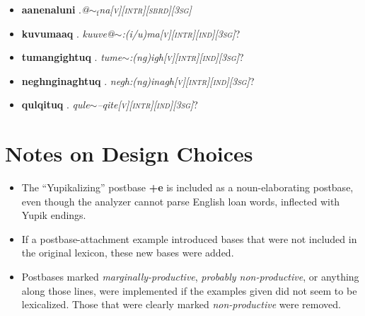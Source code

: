 \documentclass{article}
\begin{document}
\begin{itemize}
\item \textbf{aanenaluni} .\textit{@$\sim_\text{f}$na\textsc{[v][intr][sbrd][3sg]}}

\item \textbf{kuvumaaq} . \textit{kuuve@$\sim$:(i/u)ma\textsc{[v][intr][ind][3sg]}}?

\item \textbf{tumangightuq} . \textit{tume$\sim$:(ng)igh\textsc{[v][intr][ind][3sg]}}?

\item \textbf{neghnginaghtuq} . \textit{negh:(ng)inagh\textsc{[v][intr][ind][3sg]}}?

\item \textbf{qulqituq} . \textit{qule$\sim$--qite\textsc{[v][intr][ind][3sg]}}?
\end{itemize}

\pagebreak

\section{Notes on Design Choices}
\begin{itemize}
\item The ``Yupikalizing'' postbase \textbf{+e} is included as a noun-elaborating postbase, even though the analyzer cannot parse English loan words, inflected with Yupik endings.

\item If a postbase-attachment example introduced bases that were not included in the original lexicon, these new bases were added.

\item Postbases marked \textit{marginally-productive}, \textit{probably non-productive}, or anything along those lines, were implemented if the examples given did not seem to be lexicalized. Those that were clearly marked \textit{non-productive} were removed.
\end{itemize}

\pagebreak

\end{document}
